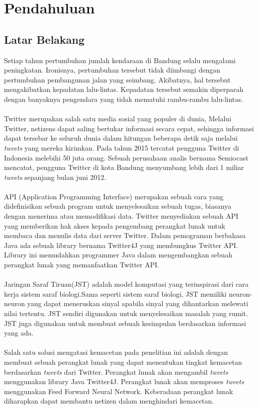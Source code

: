 \chapter{Pendahuluan}
\section{Latar Belakang}
Setiap tahun pertumbuhan jumlah kendaraan di Bandung selalu mengalami peningkatan. Ironisnya, pertumbuhan tersebut tidak diimbangi dengan pertumbuhan pembangunan jalan yang seimbang. Akibatnya, hal tersebut mengakibatkan kepadatan lalu-lintas. Kepadatan tersebut semakin diperparah dengan banyaknya pengendara yang tidak mematuhi rambu-rambu lalu-lintas.\\\\
Twitter merupakan salah satu media sosial yang populer di dunia, Melalui Twitter, netizens dapat saling bertukar informasi secara cepat, sehingga informasi dapat tersebar ke seluruh dunia dalam hitungan beberapa detik saja melalui \textit{tweets} yang mereka kirimkan. Pada tahun 2015 tercatat pengguna Twitter di Indonesia melebihi 50 juta orang. Sebuah perusahaan analis bernama Semiocast mencatat, pengguna Twitter di kota Bandung menyumbang lebih dari 1 miliar \textit{tweets} sepanjang bulan juni 2012.\\\\
API (Application Programming Interface) merupakan sebuah cara yang didefinisikan sebuah program untuk
menyelesaikan sebuah tugas, biasanya dengan menerima atau memodifikasi data. Twitter menyediakan
sebuah API yang memberikan hak akses kepada pengembang perangkat lunak untuk membaca dan menulis data dari server Twitter. Dalam pemograman berbahasa Java ada sebuah library bernama Twitter4J yang membungkus Twitter API. Library ini memudahkan programmer Java dalam mengembangkan sebuah perangkat lunak yang memanfaatkan Twitter API.\\\\
Jaringan Saraf Tiruan(JST) adalah model komputasi yang terinspirasi dari cara kerja sistem saraf biologi.Sama seperti sistem saraf biologi, JST memiliki neuron-neuron yang dapat meneruskan sinyal apabila sinyal yang dihantarkan melewati nilai tertentu. JST sendiri digunakan untuk menyelesaikan masalah yang rumit. JST juga digunakan untuk membuat sebuah kesimpulan berdasarkan informasi yang ada.\\\\
Salah satu solusi mengatasi kemacetan pada penelitian ini adalah dengan membuat sebuah perangkat lunak yang dapat menentukan tingkat kemacetan berdasarkan \textit{tweets} dari Twitter. Perangkat lunak akan mengambil \textit{tweets} menggunakan library Java Twitter4J. Perangkat lunak akan memproses \textit{tweets} menggunakan Feed Forward Neural Network. Keberadaan perangkat lunak diharapkan dapat membantu netizen dalam menghindari kemacetan.

